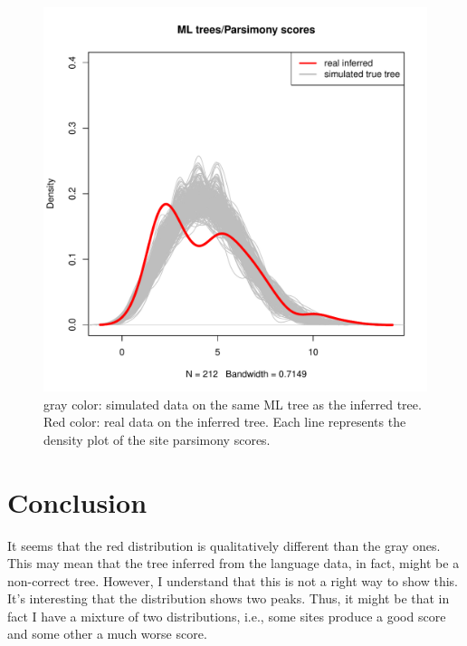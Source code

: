 \documentclass[12pt]{article}
\begin{document}
\begin{figure}[htbp!]
  \centering
  \includegraphics[width=\textwidth]{siteParsValues.pdf}
  \caption{gray color: simulated data on the same ML tree as the inferred
    tree. Red color: real data on the inferred tree. Each line
    represents the density plot of the site parsimony scores. }
\end{figure}

\section*{Conclusion}
It seems that the red distribution is qualitatively different than the
gray ones. This may mean that the tree inferred from the language
data, in fact, might be a non-correct tree. However, I understand that
this is not a right way to show this. It's interesting that the
distribution shows two peaks. Thus, it might be that in fact I have a
mixture of two distributions, i.e., some sites produce a good score
and some other a much worse score. 
\end{document}
